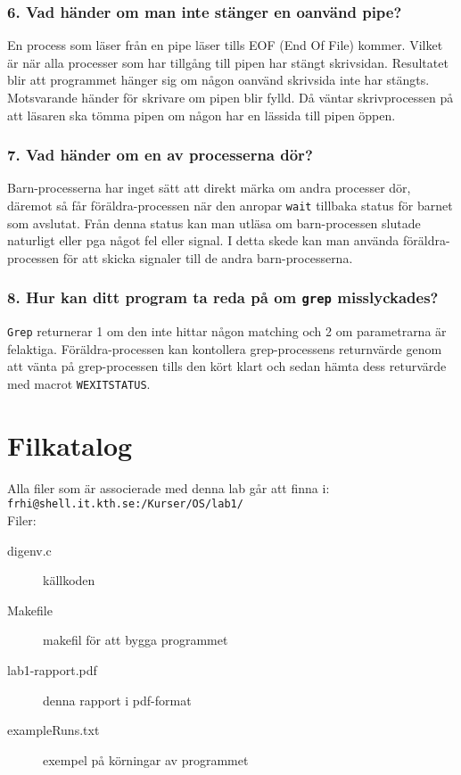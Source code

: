\documentclass[a4paper]{article}
\begin{document}
\subsubsection*{6. Vad händer om man inte stänger en oanvänd pipe?}
En process som läser från en pipe läser tills EOF (End Of File) kommer. Vilket är när alla processer som har tillgång till pipen har stängt skrivsidan. Resultatet blir att programmet hänger sig om någon oanvänd skrivsida inte har stängts. Motsvarande händer för skrivare om pipen blir fylld. Då väntar skrivprocessen på att läsaren ska tömma pipen om någon har en lässida till pipen öppen.

\subsubsection*{7. Vad händer om en av processerna dör?}
Barn-processerna har inget sätt att direkt märka om andra processer dör, däremot så får föräldra-processen när den anropar \texttt{wait} tillbaka status för barnet som avslutat. Från denna status kan man utläsa om barn-processen slutade naturligt eller pga något fel eller signal. I detta skede kan man använda föräldra-processen för att skicka signaler till de andra barn-processerna.

\subsubsection*{8. Hur kan ditt program ta reda på om \texttt{grep} misslyckades?}
\texttt{Grep} returnerar 1 om den inte hittar någon matching och 2 om parametrarna är felaktiga. Föräldra-processen kan kontollera grep-processens returnvärde genom att vänta på grep-processen tills den kört klart och sedan hämta dess returvärde med macrot \texttt{WEXITSTATUS}.

\section*{Filkatalog}
Alla filer som är associerade med denna lab går att finna i:
\texttt{frhi@shell.it.kth.se:/Kurser/OS/lab1/}
\\
Filer:
\begin{description}
\item[digenv.c] källkoden
\item[Makefile] makefil för att bygga programmet
\item[lab1-rapport.pdf] denna rapport i pdf-format
\item[exampleRuns.txt] exempel på körningar av programmet
\end{description}
\end{document}

